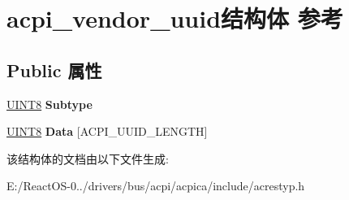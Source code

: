 \hypertarget{structacpi__vendor__uuid}{}\section{acpi\+\_\+vendor\+\_\+uuid结构体 参考}
\label{structacpi__vendor__uuid}
\subsection*{Public 属性}
\begin{DoxyCompactItemize}
\item 
\mbox{\label{structacpi__vendor__uuid_a5fde161d609638609d545bbc41b550e3}} 
\hyperlink{_processor_bind_8h_ab27e9918b538ce9d8ca692479b375b6a}{U\+I\+N\+T8} {\bfseries Subtype}
\item 
\mbox{\label{structacpi__vendor__uuid_a8521c3d8a10cf6f1a8517da366d194c1}} 
\hyperlink{_processor_bind_8h_ab27e9918b538ce9d8ca692479b375b6a}{U\+I\+N\+T8} {\bfseries Data} \mbox{[}A\+C\+P\+I\+\_\+\+U\+U\+I\+D\+\_\+\+L\+E\+N\+G\+TH\mbox{]}
\end{DoxyCompactItemize}


该结构体的文档由以下文件生成\+:\begin{DoxyCompactItemize}
\item 
E\+:/\+React\+O\+S-\/0../drivers/bus/acpi/acpica/include/acrestyp.\+h\end{DoxyCompactItemize}
